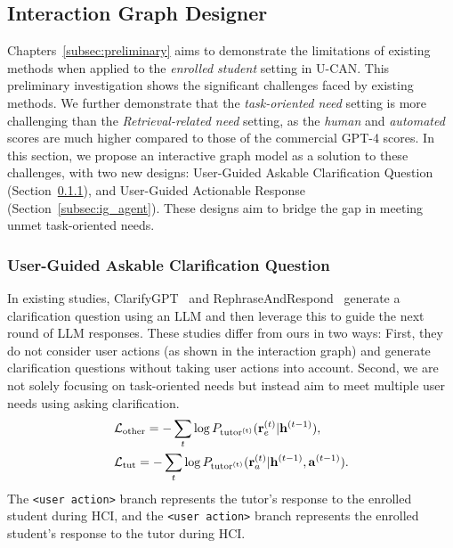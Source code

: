 \subsection{Interaction Graph Designer}
\label{intergraph}



Chapters~\ref{subsec:preliminary} aims to demonstrate the limitations of existing methods when applied to the \textit{enrolled student} setting in U-CAN.
This preliminary investigation shows the significant challenges faced by existing methods.
We further demonstrate that the \textit{task-oriented need} setting is more challenging than the \textit{Retrieval-related need} setting, as the \textit{human} and \textit{automated} scores are much higher compared to those of the commercial GPT-4 scores.
In this section, we propose an interactive graph model as a solution to these challenges, with two new designs: User-Guided Askable Clarification Question (Section~\ref{subsec:ig_user}), and User-Guided Actionable Response (Section~\ref{subsec:ig_agent}). These designs aim to bridge the gap in meeting unmet task-oriented needs.

\subsubsection{User-Guided Askable Clarification Question}
\label{subsec:ig_user}
In existing studies, ClarifyGPT~\citep{clarifygpt} and RephraseAndRespond~\citep{rethink_rephrase} generate a clarification question using an LLM and then leverage this to guide the next round of LLM responses.
These studies differ from ours in two ways: First, they do not consider user actions (as shown in the interaction graph) and generate clarification questions without taking user actions into account.
Second, we are not solely focusing on task-oriented needs but instead aim to meet multiple user needs using asking clarification.
\begin{equation}
\begin{aligned}
& \mathcal{L}_{\rm other} = - \sum_t \log P_{\rm tutor^{(t)}} (\mathbf{r}^{(t)}_e | \mathbf{h}^{(t-1)}), \\ 
& \mathcal{L}_{\rm tut} = - \sum_t \log P_{\rm tutor^{(t)}} (\mathbf{r}^{(t)}_a | \mathbf{h}^{(t-1)}, \mathbf{a}^{(t-1)}).
\end{aligned}
\end{equation}
The \colorbox{answercolor}{\texttt{<user action>}} branch represents the tutor's response to the enrolled student during HCI, and the \colorbox{answercolor}{\texttt{<user action>}} branch represents the enrolled student's response to the tutor during HCI.

